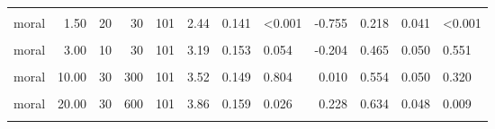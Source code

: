 \documentclass[
]{article}
\begin{document}
\begin{longtable}[t]{lrrrrrrlrrrl}
\hspace{1em}\cellcolor{gray!10}{moral} & \cellcolor{gray!10}{1.33} & \cellcolor{gray!10}{300} & \cellcolor{gray!10}{400} & \cellcolor{gray!10}{101} & \cellcolor{gray!10}{2.28} & \cellcolor{gray!10}{0.134} & \cellcolor{gray!10}{<0.001} & \cellcolor{gray!10}{-0.911} & \cellcolor{gray!10}{0.208} & \cellcolor{gray!10}{0.041} & \cellcolor{gray!10}{<0.001}\\
\hspace{1em}moral & 1.50 & 20 & 30 & 101 & 2.44 & 0.141 & <0.001 & -0.755 & 0.218 & 0.041 & <0.001\\
\hspace{1em}\cellcolor{gray!10}{moral} & \cellcolor{gray!10}{2.00} & \cellcolor{gray!10}{200} & \cellcolor{gray!10}{400} & \cellcolor{gray!10}{101} & \cellcolor{gray!10}{2.96} & \cellcolor{gray!10}{0.150} & \cellcolor{gray!10}{<0.001} & \cellcolor{gray!10}{-0.359} & \cellcolor{gray!10}{0.376} & \cellcolor{gray!10}{0.049} & \cellcolor{gray!10}{0.017}\\
\hspace{1em}moral & 3.00 & 10 & 30 & 101 & 3.19 & 0.153 & 0.054 & -0.204 & 0.465 & 0.050 & 0.551\\
\hspace{1em}\cellcolor{gray!10}{moral} & \cellcolor{gray!10}{4.00} & \cellcolor{gray!10}{100} & \cellcolor{gray!10}{400} & \cellcolor{gray!10}{101} & \cellcolor{gray!10}{3.16} & \cellcolor{gray!10}{0.145} & \cellcolor{gray!10}{0.024} & \cellcolor{gray!10}{-0.235} & \cellcolor{gray!10}{0.396} & \cellcolor{gray!10}{0.049} & \cellcolor{gray!10}{0.046}\\
\hspace{1em}moral & 10.00 & 30 & 300 & 101 & 3.52 & 0.149 & 0.804 & 0.010 & 0.554 & 0.050 & 0.320\\
\hspace{1em}\cellcolor{gray!10}{moral} & \cellcolor{gray!10}{15.00} & \cellcolor{gray!10}{400} & \cellcolor{gray!10}{6000} & \cellcolor{gray!10}{101} & \cellcolor{gray!10}{3.40} & \cellcolor{gray!10}{0.150} & \cellcolor{gray!10}{0.578} & \cellcolor{gray!10}{-0.069} & \cellcolor{gray!10}{0.505} & \cellcolor{gray!10}{0.050} & \cellcolor{gray!10}{>0.999}\\
\hspace{1em}moral & 20.00 & 30 & 600 & 101 & 3.86 & 0.159 & 0.026 & 0.228 & 0.634 & 0.048 & 0.009\\
\hspace{1em}\cellcolor{gray!10}{moral} & \cellcolor{gray!10}{30.00} & \cellcolor{gray!10}{400} & \cellcolor{gray!10}{12000} & \cellcolor{gray!10}{101} & \cellcolor{gray!10}{3.74} & \cellcolor{gray!10}{0.160} & \cellcolor{gray!10}{0.128} & \cellcolor{gray!10}{0.151} & \cellcolor{gray!10}{0.584} & \cellcolor{gray!10}{0.050} & \cellcolor{gray!10}{0.111}\\

\end{longtable}
\end{document}
